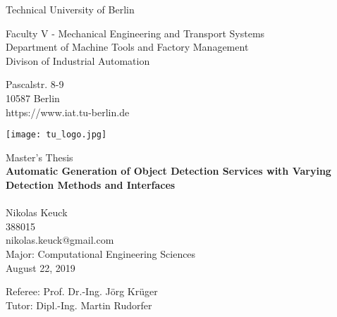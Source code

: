 \thispagestyle{empty}
\begin{center}

\vspace*{1.4cm}
{\LARGE Technical University of Berlin}

\vspace{0.5cm}
{\large Faculty V - Mechanical Engineering and Transport Systems\\[1mm]}
{\large Department of Machine Tools and Factory Management\\[1mm]}
{\large Divison of Industrial Automation\\[5mm]}

Pascalstr. 8-9\\
10587 Berlin\\
https://www.iat.tu-berlin.de\\

\vspace*{1cm}

\texttt{[image: tu\_logo.jpg]}

\vspace*{1.0cm}

{\LARGE Master's Thesis}\\

\vspace{1.0cm}
{\LARGE \textbf{Automatic Generation of Object Detection Services with Varying Detection Methods and Interfaces}}\\

{\LARGE \textbf{}}\\
\vspace*{0.5cm}
{\LARGE Nikolas Keuck}\\
388015\\
nikolas.keuck@gmail.com\\
Major: Computational Engineering Sciences
\\
\vspace*{0.5cm}
August 22, 2019\\ %
\vspace*{0.5cm}

Referee: Prof. Dr.-Ing. Jörg Krüger\\
Tutor: Dipl.-Ing. Martin Rudorfer



\end{center}
\restoregeometry
